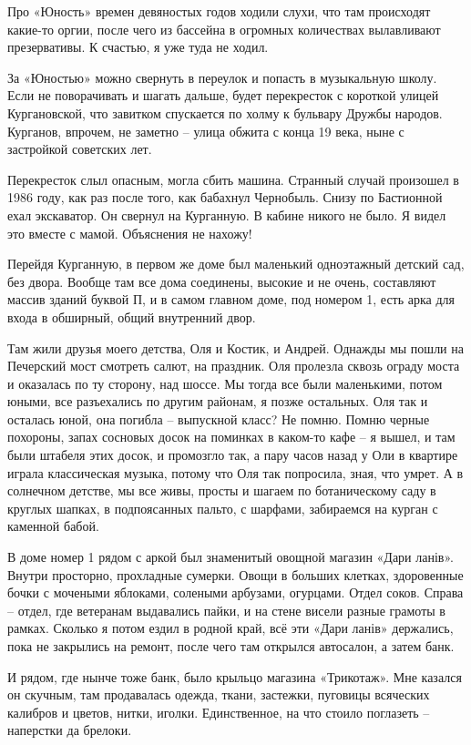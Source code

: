 Про «Юность» времен девяностых годов ходили слухи, что там происходят какие-то оргии, после чего из бассейна в огромных количествах вылавливают презервативы. К счастью, я уже туда не ходил.

За «Юностью» можно свернуть в переулок и попасть в музыкальную школу. Если не поворачивать и шагать дальше, будет перекресток с короткой улицей Кургановской, что завитком спускается по холму к бульвару Дружбы народов. Курганов, впрочем, не заметно – улица обжита с конца 19 века, ныне с застройкой советских лет.

Перекресток слыл опасным, могла сбить машина. Странный случай произошел в 1986 году, как раз после того, как бабахнул Чернобыль. Снизу по Бастионной ехал экскаватор. Он свернул на Курганную. В кабине никого не было. Я видел это вместе с мамой. Объяснения не нахожу!

Перейдя Курганную, в первом же доме был маленький одноэтажный детский сад, без двора. Вообще там все дома соединены, высокие и не очень, составляют массив зданий буквой П, и в самом главном доме, под номером 1, есть арка для входа в обширный, общий внутренний двор.

Там жили друзья моего детства, Оля и Костик, и Андрей. Однажды мы пошли на Печерский мост смотреть салют, на праздник. Оля пролезла сквозь ограду моста и оказалась по ту сторону, над шоссе. Мы тогда все были маленькими, потом юными, все разъехались по другим районам, я позже остальных. Оля так и осталась юной, она погибла – выпускной класс? Не помню. Помню черные похороны, запах сосновых досок на поминках в каком-то кафе – я вышел, и там были штабеля этих досок, и промозгло так, а пару часов назад у Оли в квартире играла классическая музыка, потому что Оля так попросила, зная, что умрет. А в солнечном детстве, мы все живы, просты и шагаем по ботаническому саду в круглых шапках, в подпоясанных пальто, с шарфами, забираемся на курган с каменной бабой.

В доме номер 1 рядом с аркой был знаменитый овощной магазин «Дари ланів». Внутри просторно, прохладные сумерки. Овощи в больших клетках, здоровенные бочки с мочеными яблоками, солеными арбузами, огурцами. Отдел соков. Справа – отдел, где ветеранам выдавались пайки, и на стене висели разные грамоты в рамках. Сколько я потом ездил в родной край, всё эти «Дари ланів» держались, пока не закрылись на ремонт, после чего там открылся автосалон, а затем банк.

И рядом, где нынче тоже банк, было крыльцо магазина «Трикотаж». Мне казался он скучным, там продавалась одежда, ткани, застежки, пуговицы всяческих калибров и цветов, нитки, иголки. Единственное, на что стоило поглазеть – наперстки да брелоки.

